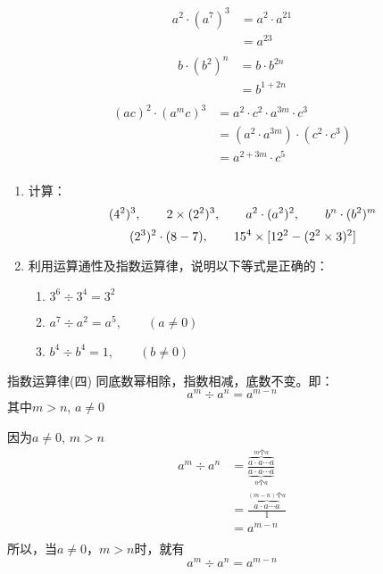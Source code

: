 \begin{solution}
	\begin{align*}
	a^2\cdot (a^7)^3&=a^2\cdot a^{21} \tag{指数运算律（三）}\\
	&= a^{23} \tag{指数运算律（一）}\\
	\end{align*}
	\begin{align*}
	b\cdot (b^2)^n&=b\cdot b^{2n} \tag{指数运算律（三）}\\
	&= b^{1+2n} \tag{指数运算律（一）}\\
	\end{align*}
	\begin{align*}
	(ac)^2\cdot (a^m c)^3&=a^2\cdot c^2\cdot a^{3m}\cdot c^3 \tag{指数运算律（三）}\\
	&=(a^2\cdot a^{3m})\cdot (c^2\cdot c^3) \tag{乘法交换、结合律}\\
	&= a^{2+3m}\cdot c^5 \tag{指数运算律（一）}\\
	\end{align*}        
\end{solution}

\begin{ex}
	\begin{enumerate}
		\item 计算：
		$$(4^2)^3,\qquad 2 \times (2^2)^3,\qquad a^2\cdot (a^2)^2,\qquad b^n\cdot (b^2)^m$$
		$$(2^3)^2 \cdot (8-7),\qquad       15^4 \times [12^2-(2^2 \times3)^2]$$
		\item 利用运算通性及指数运算律，说明以下等式是正确的：
		\begin{enumerate}
			\item $3^6\div 3^4=3^2$
			\item $a^7\div a^2=a^5,\qquad (a\ne 0)$
			\item $b^4\div b^4=1, \qquad (b\ne 0)$
		\end{enumerate}
		
	\end{enumerate}   
\end{ex}

\begin{blk}{指数运算律(四)}
	同底数幂相除，指数相减，底数不变。即：
	\[a^m \div a^n=a^{m-n}\]
	其中$m>n$,  $a\ne 0$
\end{blk}

\begin{rmk}
	因为$a\ne 0$, $m>n$
	\begin{align*}
	a^m \div a^n&=\frac{\overbrace{a\cdot a\cdots a}^{\text{$m$个$a$}}}{\underbrace{a\cdot a\cdots a}_{\text{$n$个$a$}}}  \tag{乘方的意义}\\
	&=\frac{\overbrace{a\cdot a\cdots a}^{\text{$(m-n)$个$a$}}}{1}  \tag{除法的性质}\\
	&=a^{m-n}\tag{乘方的意义}\\
	\end{align*}    
	所以，当$a\ne 0$，$m>n$时，就有
	\[a^m \div a^n=a^{m-n}\]
\end{rmk}

